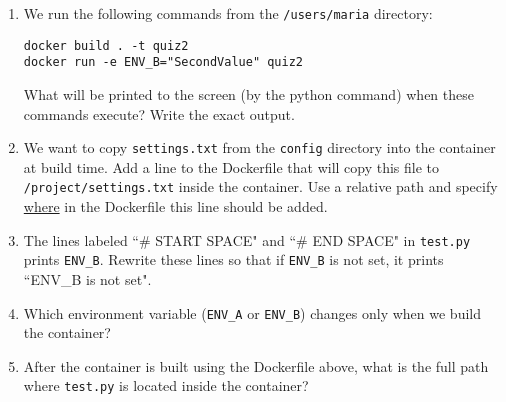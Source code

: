 \documentclass[11pt]{article}
\begin{document}
\begin{enumerate}

\item We run the following commands from the \texttt{/users/maria} directory:
\begin{verbatim}
docker build . -t quiz2
docker run -e ENV_B="SecondValue" quiz2
\end{verbatim}

What will be printed to the screen (by the python command) when these commands execute? Write the exact output.

\vspace{3cm}

\item We want to copy \texttt{settings.txt} from the \texttt{config} directory into the container at build time. Add a line to the Dockerfile that will copy this file to \texttt{/project/settings.txt} inside the container. Use a relative path and specify \underline{where} in the Dockerfile this line should be added.

\vspace{4cm}

\item The lines labeled ``\# START SPACE" and ``\# END SPACE" in \texttt{test.py} prints \texttt{ENV\_B}. Rewrite these lines so that if \texttt{ENV\_B} is not set, it prints ``ENV\_B is not set".

\vspace{5cm}

\item Which environment variable (\texttt{ENV\_A} or \texttt{ENV\_B}) changes only when we build the container? 

\vspace{3cm}

\item After the container is built using the Dockerfile above, what is the full path where \texttt{test.py} is located inside the container? 

\end{enumerate}
\end{document}
